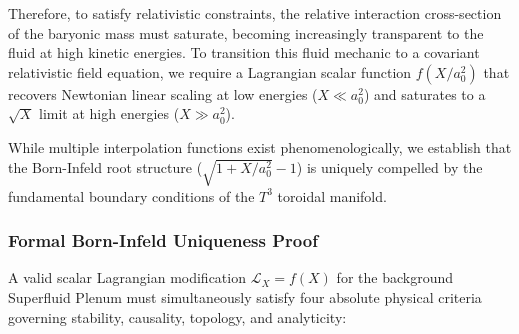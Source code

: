 \documentclass[aps,prd,10pt,twocolumn,superscriptaddress,nofootinbib,floatfix]{revtex4-2}
\begin{document}
Therefore, to satisfy relativistic constraints, the relative interaction cross-section of the baryonic mass must saturate, becoming increasingly transparent to the fluid at high kinetic energies. To transition this fluid mechanic to a covariant relativistic field equation, we require a Lagrangian scalar function $f(X/a_0^2)$ that recovers Newtonian linear scaling at low energies ($X \ll a_0^2$) and saturates to a $\sqrt{X}$ limit at high energies ($X \gg a_0^2$).

While multiple interpolation functions exist phenomenologically, we establish that the Born-Infeld root structure ($\sqrt{1+X/a_0^2}-1$) is uniquely compelled by the fundamental boundary conditions of the $T^3$ toroidal manifold.

\subsubsection{Formal Born-Infeld Uniqueness Proof}
A valid scalar Lagrangian modification $\mathcal{L}_X = f(X)$ for the background Superfluid Plenum must simultaneously satisfy four absolute physical criteria governing stability, causality, topology, and analyticity:
\end{document}
